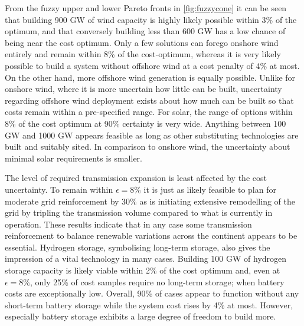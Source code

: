 From the fuzzy upper and lower Pareto fronts in \cref{fig:fuzzycone} it can be
seen that building 900 GW of wind capacity is highly likely possible within 3\%
of the optimum, and that conversely building less than 600 GW has a low chance
of being near the cost optimum. Only a few solutions can forego onshore wind
entirely and remain within 8\% of the cost-optimum, whereas it is very likely
possible to build a system without offshore wind at a cost penalty of 4\% at
most. On the other hand, more offshore wind generation is equally possible.
Unlike for onshore wind, where it is more uncertain how little can be built,
uncertainty regarding offshore wind deployment exists about how much can be
built so that costs remain within a pre-specified range. For solar, the range of
options within 8\% of the cost optimum at 90\% certainty is very wide. Anything
between 100 GW and 1000 GW appears feasible as long as other substituting
technologies are built and suitably sited. In comparison to onshore wind, the
uncertainty about minimal solar requirements is smaller.

The level of required transmission expansion is least affected by the cost uncertainty.
To remain within $\epsilon=8\%$ it is just as likely feasible to
plan for moderate grid reinforcement by 30\% as
is initiating extensive remodelling of the grid by tripling the transmission volume
compared to what is currently in operation.
These results indicate that in any case some transmission reinforcement
to balance renewable variations across the continent appears to be essential.
Hydrogen storage, symbolising long-term storage, also gives the impression of a vital technology in many cases.
Building 100 GW of hydrogen storage capacity is likely viable within 2\% of the cost optimum
and, even at $\epsilon=8\%$, only 25\% of cost samples require no long-term storage;
when battery costs are exceptionally low.
Overall, 90\% of cases appear to function without any short-term battery storage
while the system cost rises by 4\% at most.
However, especially battery storage exhibits a large degree of freedom to build more.


